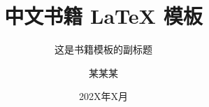 \documentclass[openany,twoside,zihao=-4]{zhbook}
\title{中文书籍 \LaTeX{} 模板}  %
\subtitle{这是书籍模板的副标题}  %
\author{某某某}  %
\date{202X年X月}  %
\begin{document}
\maketitle

%



\frontmatter





%


%


\maketoc

\makelof

\makelot






\mainmatter



















%







\backmatter  %


\printindex




\end{document}
